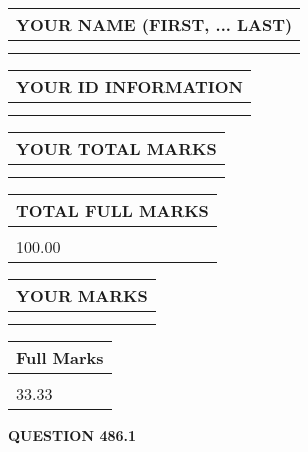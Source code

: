 \documentclass{ctexart}
\begin{document}
   
   
   
\newpage 
\setcounter{page}{ 
   486001 } 
   
   
   
   
\noindent\begin{tabular}{|l|}
\hline
YOUR NAME (FIRST, ... LAST)  \\
\hline
 \\ 
 \\ 
\hline
\end{tabular}
\hspace{0.05in} \begin{tabular}{|l|}
\hline
 YOUR   ID   INFORMATION  \\
\hline
 \\ 
 \\ 
\hline
\end{tabular}
   
   
\vspace{0.2in}\noindent\begin{tabular}{|l|}
\hline
YOUR TOTAL MARKS  \\
\hline
 \\ 
 \\ 
\hline
\end{tabular}
\hspace{0.05in} \begin{tabular}{|l|}
\hline
TOTAL FULL MARKS  \\
\hline
 \\ 
100.00 \\
\hline
\end{tabular}
   
   
 \vspace{0.2in}
 
 
 
 
   
   
  
\vspace{0.2in}
  
\noindent\begin{tabular}{|l|}
\hline
 YOUR MARKS  \\
\hline
 \\ 
 \\ 
\hline
\end{tabular}
\hspace{0.05in} \begin{tabular}{|l|}
\hline
 Full Marks  \\
\hline
 \\ 
33.33 \\
\hline
\end{tabular}
{\textbf{\Large{QUESTION
486.1 
}}}
  
\end{document}
